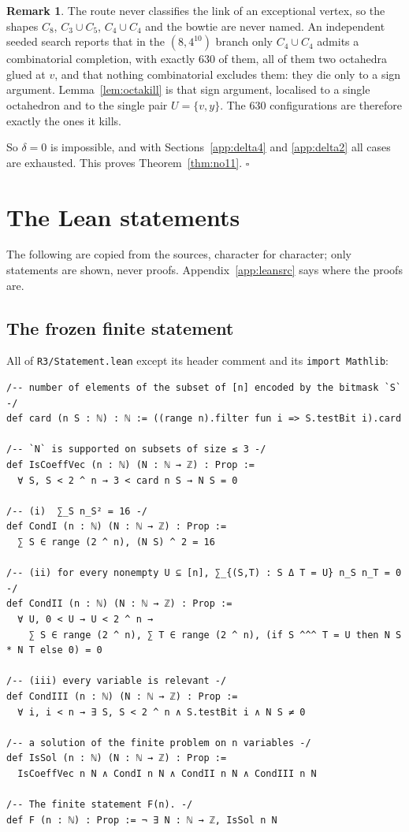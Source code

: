 \documentclass[11pt,reqno]{amsart}
\theoremstyle{plain}
\theoremstyle{definition}
\newtheorem{remark}[theorem]{Remark}
\numberwithin{theorem}{section}
\begin{document}
\begin{remark}
The route never classifies the link of an exceptional vertex, so the shapes $C_8$,
$C_3 \cup C_5$, $C_4 \cup C_4$ and the bowtie are never named. An independent seeded search
reports that in the $(8,4^{10})$ branch only $C_4 \cup C_4$ admits a combinatorial completion,
with exactly $630$ of them, all of them two octahedra glued at $v$, and that nothing
combinatorial excludes them: they die only to a sign argument. Lemma~\ref{lem:octakill} is that
sign argument, localised to a single octahedron and to the single pair $U = \{v,y\}$. The $630$
configurations are therefore exactly the ones it kills.
\end{remark}

\medskip
So $\delta = 0$ is impossible, and with Sections~\ref{app:delta4} and \ref{app:delta2} all cases
are exhausted. This proves Theorem~\ref{thm:no11}. \hfill$\square$

\section{The Lean statements}\label{app:leanstmt}
\sloppy
The following are copied from the sources, character for character; only statements are shown,
never proofs. Appendix~\ref{app:leansrc} says where the proofs are.

\subsection{The frozen finite statement}
All of \texttt{R3/Statement.lean} except its header comment and its \texttt{import Mathlib}:

\begin{Verbatim}[fontsize=\footnotesize,formatcom=\ttfamily,samepage=false]
/-- number of elements of the subset of [n] encoded by the bitmask `S` -/
def card (n S : ℕ) : ℕ := ((range n).filter fun i => S.testBit i).card

/-- `N` is supported on subsets of size ≤ 3 -/
def IsCoeffVec (n : ℕ) (N : ℕ → ℤ) : Prop :=
  ∀ S, S < 2 ^ n → 3 < card n S → N S = 0

/-- (i)  ∑_S n_S² = 16 -/
def CondI (n : ℕ) (N : ℕ → ℤ) : Prop :=
  ∑ S ∈ range (2 ^ n), (N S) ^ 2 = 16

/-- (ii) for every nonempty U ⊆ [n], ∑_{(S,T) : S Δ T = U} n_S n_T = 0 -/
def CondII (n : ℕ) (N : ℕ → ℤ) : Prop :=
  ∀ U, 0 < U → U < 2 ^ n →
    ∑ S ∈ range (2 ^ n), ∑ T ∈ range (2 ^ n), (if S ^^^ T = U then N S * N T else 0) = 0

/-- (iii) every variable is relevant -/
def CondIII (n : ℕ) (N : ℕ → ℤ) : Prop :=
  ∀ i, i < n → ∃ S, S < 2 ^ n ∧ S.testBit i ∧ N S ≠ 0

/-- a solution of the finite problem on n variables -/
def IsSol (n : ℕ) (N : ℕ → ℤ) : Prop :=
  IsCoeffVec n N ∧ CondI n N ∧ CondII n N ∧ CondIII n N

/-- The finite statement F(n). -/
def F (n : ℕ) : Prop := ¬ ∃ N : ℕ → ℤ, IsSol n N
\end{Verbatim}
\end{document}
